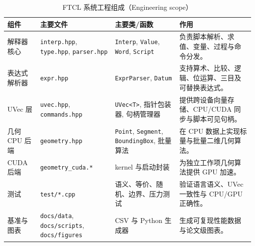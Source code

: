 \begin{table}[htbp]
\centering
\caption{FTCL 系统工程组成（Engineering scope）}
\label{tab:engineering-scope}
\small
\begin{tabularx}{\textwidth}{lXXX}
\toprule
组件 & 主要文件 & 主要类/函数 & 作用 \\
\midrule
解释器核心 & \texttt{interp.hpp}, \texttt{type.hpp}, \texttt{parser.hpp} & \texttt{Interp}, \texttt{Value}, \texttt{Word}, \texttt{Script} & 负责脚本解析、求值、变量、过程与命令分发。 \\
表达式解析器 & \texttt{expr.hpp} & \texttt{ExprParser}, \texttt{Datum} & 支持算术、比较、逻辑、位运算、三目及可替换表达式。 \\
UVec 层 & \texttt{uvec.hpp}, \texttt{commands.hpp} & \texttt{UVec<T>}, 指针包装器, 句柄管理器 & 提供跨设备向量存储、CPU/CUDA 同步与脚本可见句柄。 \\
几何 CPU 后端 & \texttt{geometry.hpp} & \texttt{Point}, \texttt{Segment}, \texttt{BoundingBox}, 批量算法 & 在 CPU 数据上实现标量与批量二维几何算法。 \\
CUDA 后端 & \texttt{geometry\_cuda.*} & kernel 与启动封装 & 为独立工作项几何算法提供 GPU 加速。 \\
测试 & \texttt{test/*.cpp} & 语义、等价、随机、边界、压力测试 & 验证语言语义、UVec 一致性与 CPU/GPU 正确性。 \\
基准与图表 & \texttt{docs/data}, \texttt{docs/scripts}, \texttt{docs/figures} & CSV 与 Python 生成器 & 生成可复现性能数据与论文级图表。 \\
\bottomrule
\end{tabularx}
\end{table}

